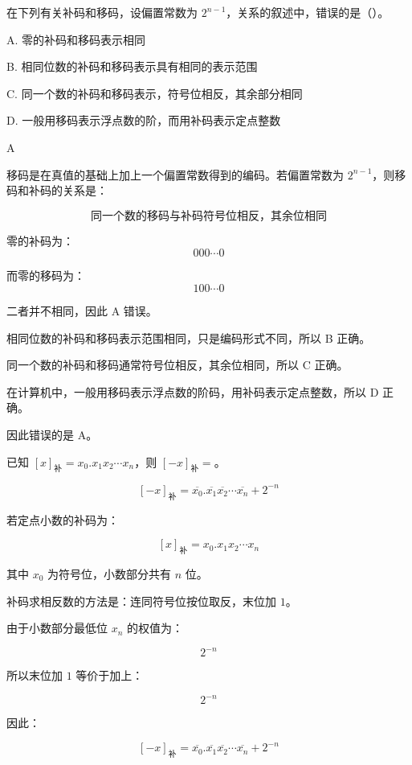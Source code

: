 \begin{question}
在下列有关补码和移码，设偏置常数为 $2^{n-1}$，关系的叙述中，错误的是（）。

A. 零的补码和移码表示相同

B. 相同位数的补码和移码表示具有相同的表示范围

C. 同一个数的补码和移码表示，符号位相反，其余部分相同

D. 一般用移码表示浮点数的阶，而用补码表示定点整数
\end{question}

\begin{answer}
A
\end{answer}

\begin{analysisenv}
移码是在真值的基础上加上一个偏置常数得到的编码。若偏置常数为 $2^{n-1}$，则移码和补码的关系是：

\[
\text{同一个数的移码与补码符号位相反，其余位相同}
\]

零的补码为：
\[
000\cdots 0
\]

而零的移码为：
\[
100\cdots 0
\]

二者并不相同，因此 A 错误。

相同位数的补码和移码表示范围相同，只是编码形式不同，所以 B 正确。

同一个数的补码和移码通常符号位相反，其余位相同，所以 C 正确。

在计算机中，一般用移码表示浮点数的阶码，用补码表示定点整数，所以 D 正确。

因此错误的是 A。
\end{analysisenv}


\begin{question}
已知 $[x]_{\text{补}}=x_0.x_1x_2\cdots x_n$，则 $[-x]_{\text{补}}=$\underline{\hspace{4cm}}。
\end{question}

\begin{answer}
\[
[-x]_{\text{补}}
=
\overline{x_0}.\overline{x_1}\overline{x_2}\cdots \overline{x_n}
+
2^{-n}
\]
\end{answer}

\begin{analysisenv}
若定点小数的补码为：

\[
[x]_{\text{补}}=x_0.x_1x_2\cdots x_n
\]

其中 $x_0$ 为符号位，小数部分共有 $n$ 位。

补码求相反数的方法是：连同符号位按位取反，末位加 $1$。

由于小数部分最低位 $x_n$ 的权值为：

\[
2^{-n}
\]

所以末位加 $1$ 等价于加上：

\[
2^{-n}
\]

因此：

\[
[-x]_{\text{补}}
=
\overline{x_0}.\overline{x_1}\overline{x_2}\cdots \overline{x_n}
+
2^{-n}
\]
\end{analysisenv}




